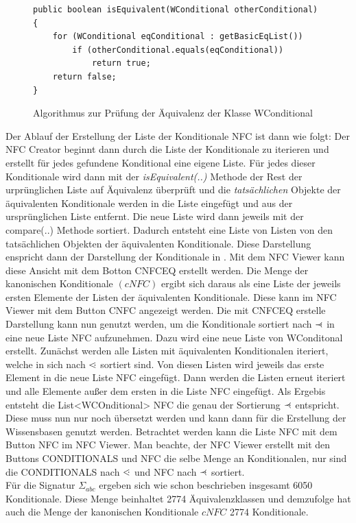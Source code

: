 \documentclass[12pt,a4paper]{article}
\newcommand\dotl{\mathrel{%
    \mathchoice{\QEQ}{\QEQ}{\QEQ}{\QEQ}%
}}
\def\QEQ{{%
    \setbox0\hbox{<}%
    \rlap{\hbox to \wd0{\hss \raisebox {0.1pt}{$\ \cdot$\hss}}}\box0
}}
\newcommand\rdotl{\mathrel{%
    \mathchoice{\RQEQ}{\RQEQ}{\RQEQ}{\RQEQ}%
}}
\def\RQEQ{{%
    \setbox0\hbox{$\prec$}%
    \rlap{\hbox to \wd0{\hss \raisebox {0.01pt}{$\ \cdot$\hss}}}\box0
}}
\begin{document}
\begin{figure}
\begin{lstlisting}
public boolean isEquivalent(WConditional otherConditional) {
    for (WConditional eqConditional : getBasicEqList())
        if (otherConditional.equals(eqConditional))
            return true;
    return false;
}
\end{lstlisting}
\caption{Algorithmus zur Prüfung der Äquivalenz der Klasse WConditional}
\label{code:test-equivalence}
\end{figure} 


Der Ablauf der Erstellung der Liste der Konditionale NFC ist dann wie folgt: Der NFC Creator beginnt dann durch die Liste der Konditionale zu iterieren und erstellt für jedes gefundene Konditional eine eigene Liste. Für jedes dieser Konditionale wird dann mit der \textit{isEquivalent(..)} Methode der Rest der urprünglichen Liste auf Äquivalenz überprüft und die \textit{tatsächlichen} Objekte der äquivalenten Konditionale werden in die Liste eingefügt und aus der ursprünglichen Liste entfernt. Die neue Liste wird dann jeweils mit der compare(..) Methode sortiert. Dadurch entsteht eine Liste von Listen von den tatsächlichen Objekten der äquivalenten Konditionale. Diese Darstellung enspricht dann der Darstellung der Konditionale in \cite{beierle19}. Mit dem NFC Viewer kann diese Ansicht mit dem Botton CNFCEQ erstellt werden. Die Menge der kanonischen Konditionale $(cNFC)$ ergibt sich daraus als eine Liste der jeweils ersten Elemente der Listen der äquivalenten Konditionale. Diese kann im NFC Viewer mit dem Button CNFC angezeigt werden.
Die mit CNFCEQ erstelle Darstellung kann nun genutzt werden, um die Konditionale sortiert nach $\rdotl$ in eine neue Liste NFC aufzunehmen. Dazu wird eine neue Liste von WConditonal erstellt. Zunächst werden alle Listen mit äquivalenten Konditionalen iteriert, welche in sich nach $\dotl$ sortiert sind. Von diesen Listen wird jeweils das erste Element in die neue Liste NFC eingefügt. Dann werden die Listen erneut iteriert und alle Elemente außer dem ersten in die Liste NFC eingefügt. Als Ergebis entsteht die List<WCOnditional> NFC die genau der Sortierung $\rdotl$ entspricht. Diese muss nun nur noch übersetzt werden und kann dann für die Erstellung der Wissensbasen genutzt werden. Betrachtet werden kann die Liste NFC mit dem Button NFC im NFC Viewer. Man beachte, der NFC Viewer erstellt mit den Buttons CONDITIONALS und NFC die selbe Menge an Konditionalen, nur sind die CONDITIONALS nach $\dotl$ und NFC nach $\rdotl$ sortiert. \\
Für die Signatur $\Sigma_{abc}$ ergeben sich wie schon beschrieben insgesamt 6050 Konditionale. Diese Menge beinhaltet 2774 Äquivalenzklassen und demzufolge hat auch die Menge der kanonischen Konditionale $cNFC$ 2774 Konditionale.
\end{document}
